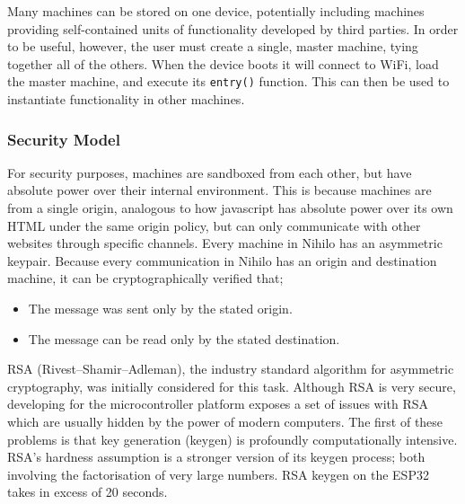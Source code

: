 \documentclass{article}
\begin{document}
Many machines can be stored on one device, potentially including machines providing self-contained units of functionality developed by third parties. In order to be useful, however, the user must create a single, master machine, tying together all of the others. When the device boots it will connect to WiFi, load the master machine, and execute its \texttt{entry()} function. This can then be used to instantiate functionality in other machines.

\subsubsection{Security Model}

For security purposes, machines are sandboxed from each other, but have absolute power over their internal environment. This is because machines are from a single origin, analogous to how javascript has absolute power over its own HTML under the same origin policy, but can only communicate with other websites through specific channels. Every machine in Nihilo has an asymmetric keypair. Because every communication in Nihilo has an origin and destination machine, it can be cryptographically verified that;
\begin{itemize}
\item The message was sent only by the stated origin.
\item The message can be read only by the stated destination.
\end{itemize}

RSA (Rivest–Shamir–Adleman)\cite{rsa}, the industry standard algorithm for asymmetric cryptography, was initially considered for this task. Although RSA is very secure, developing for the microcontroller platform exposes a set of issues with RSA which are usually hidden by the power of modern computers. The first of these problems is that key generation (keygen) is profoundly computationally intensive. RSA's hardness assumption is a stronger version of its keygen process; both involving the factorisation of very large numbers. RSA keygen on the ESP32 takes in excess of 20 seconds.
\end{document}
